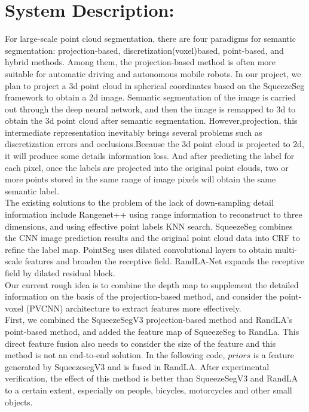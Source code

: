 \documentclass{article}
\begin{document}
\begin{normalsize}
\begin{itemize}
\end{itemize}
        
    	\section{System Description:}
        
         For large-scale point cloud segmentation, there are four paradigms for semantic segmentation: projection-based, discretization(voxel)based, point-based, and hybrid methods. Among them, the projection-based method is often more suitable for automatic driving and autonomous mobile robots. In our project, we plan to project a 3d point cloud in spherical coordinates based on the SqueezeSeg framework to obtain a 2d image. Semantic segmentation of the image is carried out through the deep neural network, and then the image is remapped to 3d to obtain the 3d point cloud after semantic segmentation. However,projection, this intermediate representation inevitably brings several problems such as discretization errors and occlusions.Because the 3d point cloud is projected to 2d, it will produce some details information loss. And after predicting the label for each pixel, once the labels are projected into the original point clouds, two or more points stored in the same range of image pixels will obtain the same semantic label. \\
         The existing solutions to the problem of the lack of down-sampling detail information include Rangenet++ using range information to reconstruct to three dimensions, and using effective point labels KNN search. SqueezeSeg combines the CNN image prediction results and the original point cloud data into CRF to refine the label map. PointSeg uses dilated convolutional layers to obtain multi-scale features and broaden the receptive field. RandLA-Net expands the receptive field by dilated residual block.\\
         Our current rough idea is to combine the depth map to supplement the detailed information on the basis of the projection-based method, and consider the point-voxel (PVCNN) architecture to extract features more effectively. \\
         First, we combined the SqueezeSegV3 projection-based method and RandLA's\cite{Hu2019RandLA} point-based method, and added the feature map of SqueezeSeg to RandLa. This direct feature fusion also needs to consider the size of the feature and this method is not an end-to-end solution. In the following code, $priors$ is a feature generated by SqueezesegV3 and is fused in RandLA. After experimental verification, the effect of this method is better than SqueezeSegV3 and RandLA to a certain extent, especially on people, bicycles, motorcycles and other small objects.\\

\end{normalsize}
\end{document}
